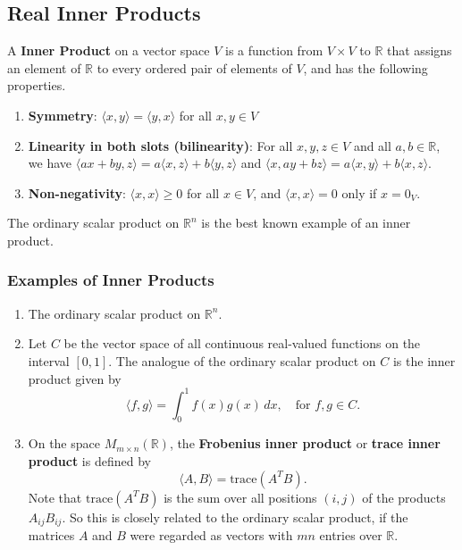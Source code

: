 \documentclass[a4paper, 9pt]{extarticle}
\begin{document}
\subsection{Real Inner Products}
A \textbf{{Inner Product}} on a vector space $V$ is a function from $V \times V$ to $\mathbb{R}$ that assigns an element of $\mathbb{R}$ to every ordered pair of elements of $V$, and has the following properties.

\begin{enumerate}
  \item \textbf{Symmetry}: $\langle x, y \rangle = \langle y, x \rangle$ for all $x, y \in V$
  \item \textbf{Linearity in both slots (bilinearity)}: For all $x, y, z \in V$ and all $a, b \in \mathbb{R}$, we have
        $\langle ax + by, z \rangle = a\langle x, z \rangle + b\langle y, z \rangle$ and
        $\langle x, ay + bz \rangle = a\langle x, y \rangle + b\langle x, z \rangle$.
  \item \textbf{Non-negativity}: $\langle x, x \rangle \geq 0$ for all $x \in V$, and $\langle x, x \rangle = 0$ only if $x = 0_V$.
\end{enumerate}

The ordinary scalar product on $\mathbb{R}^n$ is the best known example of an inner product.
\subsubsection{Examples of Inner Products}
\begin{enumerate}
  \item The ordinary scalar product on $\mathbb{R}^n$.

  \item Let $C$ be the vector space of all continuous real-valued functions on the interval $[0, 1]$. The analogue of the ordinary scalar product on $C$ is the inner product given by
        $$
          \langle f, g \rangle = \int_0^1 f(x)g(x)\, dx, \quad \text{for } f, g \in C.
        $$

  \item On the space $M_{m \times n}(\mathbb{R})$, the \textbf{Frobenius inner product} or \textbf{trace inner product} is defined by
        $$
          \langle A, B \rangle = \text{trace}(A^T B).
        $$
        Note that $\text{trace}(A^T B)$ is the sum over all positions $(i,j)$ of the products $A_{ij}B_{ij}$. So this is closely related to the ordinary scalar product, if the matrices $A$ and $B$ were regarded as vectors with $mn$ entries over $\mathbb{R}$.
\end{enumerate}
\end{document}
